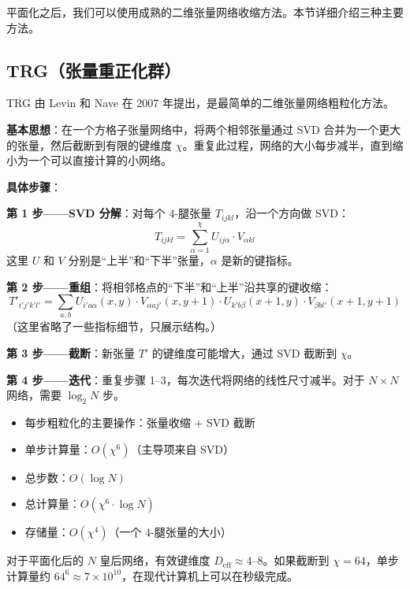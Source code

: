 \documentclass[12pt,a4paper]{ctexart}
\begin{document}
平面化之后，我们可以使用成熟的二维张量网络收缩方法。本节详细介绍三种主要方法。

\subsection{TRG（张量重正化群）}

TRG 由 Levin 和 Nave 在 2007 年提出，是最简单的二维张量网络粗粒化方法。

\textbf{基本思想}：在一个方格子张量网络中，将两个相邻张量通过 SVD 合并为一个更大的张量，然后截断到有限的键维度 $\chi$。重复此过程，网络的大小每步减半，直到缩小为一个可以直接计算的小网络。

\textbf{具体步骤}：

\textbf{第 1 步——SVD 分解}：对每个 4-腿张量 $T_{ijkl}$，沿一个方向做 SVD：
\begin{equation}
T_{ijkl} = \sum_{\alpha=1}^{\chi} U_{ij\alpha} \cdot V_{\alpha kl}
\end{equation}
这里 $U$ 和 $V$ 分别是``上半''和``下半''张量，$\alpha$ 是新的键指标。

\textbf{第 2 步——重组}：将相邻格点的``下半''和``上半''沿共享的键收缩：
\begin{equation}
T'_{i'j'k'l'} = \sum_{a,b} U_{i'a\alpha}(x,y) \cdot V_{\alpha aj'}(x,y+1) \cdot U_{k'b\beta}(x+1,y) \cdot V_{\beta bl'}(x+1,y+1)
\end{equation}
（这里省略了一些指标细节，只展示结构。）

\textbf{第 3 步——截断}：新张量 $T'$ 的键维度可能增大，通过 SVD 截断到 $\chi$。

\textbf{第 4 步——迭代}：重复步骤 1--3，每次迭代将网络的线性尺寸减半。对于 $N \times N$ 网络，需要 $\log_2 N$ 步。

\begin{tcolorbox}[title=TRG 的计算复杂度, colback=blue!5, colframe=tensorblue]
\begin{itemize}
\item 每步粗粒化的主要操作：张量收缩 + SVD 截断
\item 单步计算量：$O(\chi^6)$（主导项来自 SVD）
\item 总步数：$O(\log N)$
\item 总计算量：$O(\chi^6 \cdot \log N)$
\item 存储量：$O(\chi^4)$（一个 4-腿张量的大小）
\end{itemize}

对于平面化后的 $N$ 皇后网络，有效键维度 $D_{\text{eff}} \approx 4$--$8$。如果截断到 $\chi = 64$，单步计算量约 $64^6 \approx 7 \times 10^{10}$，在现代计算机上可以在秒级完成。
\end{tcolorbox}
\end{document}
